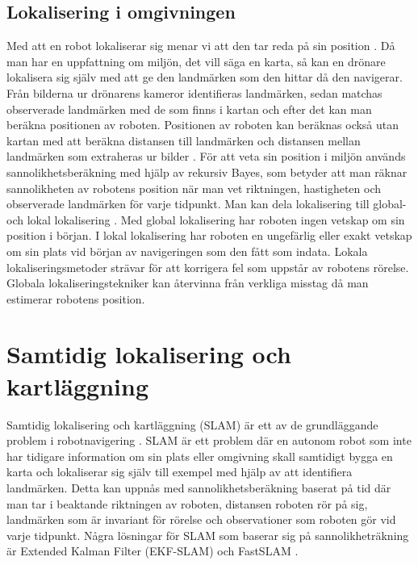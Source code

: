 \section{Lokalisering i omgivningen}

Med att en robot lokaliserar sig menar vi att den tar reda på sin position \citep{982903}. Då man har en uppfattning om miljön, det vill säga en karta, så kan en drönare lokalisera sig själv med att ge den landmärken som den hittar då den navigerar. Från bilderna ur drönarens kameror identifieras landmärken, sedan matchas observerade landmärken med de som finns i kartan och efter det kan man beräkna positionen av roboten. Positionen av roboten kan beräknas också utan kartan med att beräkna distansen till landmärken och distansen mellan landmärken som extraheras ur bilder \citep{realslamproblem}. För att veta sin position i miljön används sannolikhetsberäkning med hjälp av rekursiv Bayes, som betyder att man räknar sannolikheten av robotens position när man vet riktningen, hastigheten och observerade landmärken för varje tidpunkt. Man kan dela lokalisering till global- och lokal lokalisering \citep{982903, globalsubmaps}. Med global lokalisering har roboten ingen vetskap om sin position i början. I lokal lokalisering har roboten en ungefärlig eller exakt vetskap om sin plats vid början av navigeringen som den fått som indata. Lokala lokaliseringsmetoder strävar för att korrigera fel som uppstår av robotens rörelse. Globala lokaliseringstekniker kan återvinna från verkliga misstag då man estimerar robotens position.

\chapter{Samtidig lokalisering och kartläggning}

Samtidig lokalisering och kartläggning (SLAM) är ett av de grundläggande problem i robotnavigering \citep{realslamproblem}. SLAM är ett problem där en autonom robot som inte har tidigare information om sin plats eller omgivning skall samtidigt bygga en karta och lokaliserar sig själv till exempel med hjälp av att identifiera landmärken. Detta kan uppnås med sannolikhetsberäkning baserat på tid där man tar i beaktande riktningen av roboten, distansen roboten rör på sig, landmärken som är invariant för rörelse och observationer som roboten gör vid varje tidpunkt. Några lösningar för SLAM som baserar sig på sannolikheträkning är Extended Kalman Filter (EKF-SLAM) och FastSLAM \citep{realslamproblem}. 

